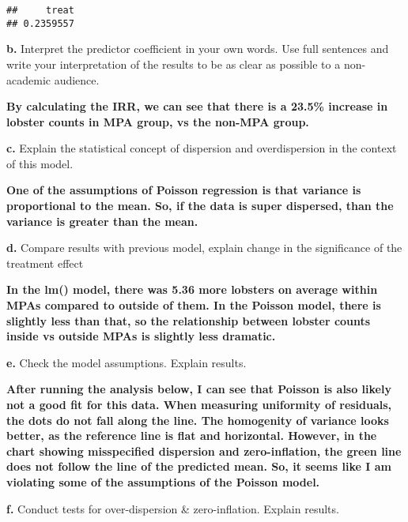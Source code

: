 \documentclass[
]{article}
\newenvironment{Shaded}{\begin{snugshade}}{\end{snugshade}}
\newcommand{\CommentTok}[1]{\textcolor[rgb]{0.56,0.35,0.01}{\textit{#1}}}
\newcommand{\DecValTok}[1]{\textcolor[rgb]{0.00,0.00,0.81}{#1}}
\newcommand{\FunctionTok}[1]{\textcolor[rgb]{0.13,0.29,0.53}{\textbf{#1}}}
\newcommand{\NormalTok}[1]{#1}
\newcommand{\SpecialCharTok}[1]{\textcolor[rgb]{0.81,0.36,0.00}{\textbf{#1}}}
\begin{document}
\begin{Shaded}
\end{Shaded}

\begin{verbatim}
##     treat 
## 0.2359557
\end{verbatim}

\textbf{b.} Interpret the predictor coefficient in your own words. Use
full sentences and write your interpretation of the results to be as
clear as possible to a non-academic audience.

\textbf{By calculating the IRR, we can see that there is a 23.5\%
increase in lobster counts in MPA group, vs the non-MPA group.}

\textbf{c.} Explain the statistical concept of dispersion and
overdispersion in the context of this model.

\textbf{One of the assumptions of Poisson regression is that variance is
proportional to the mean. So, if the data is super dispersed, than the
variance is greater than the mean.}

\textbf{d.} Compare results with previous model, explain change in the
significance of the treatment effect

\textbf{In the lm() model, there was 5.36 more lobsters on average
within MPAs compared to outside of them. In the Poisson model, there is
slightly less than that, so the relationship between lobster counts
inside vs outside MPAs is slightly less dramatic.}

\textbf{e.} Check the model assumptions. Explain results.

\textbf{After running the analysis below, I can see that Poisson is also
likely not a good fit for this data. When measuring uniformity of
residuals, the dots do not fall along the line. The homogenity of
variance looks better, as the reference line is flat and horizontal.
However, in the chart showing misspecified dispersion and
zero-inflation, the green line does not follow the line of the predicted
mean. So, it seems like I am violating some of the assumptions of the
Poisson model.}

\textbf{f.} Conduct tests for over-dispersion \& zero-inflation. Explain
results.
\end{document}
